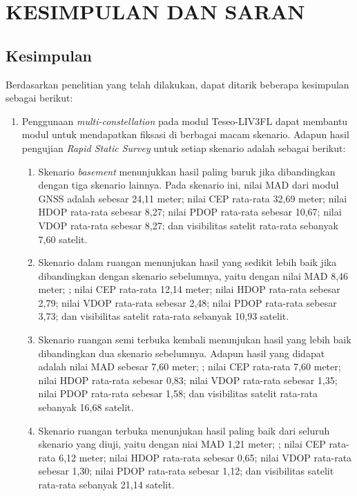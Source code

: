\chapter{KESIMPULAN DAN SARAN}

\section{Kesimpulan}
Berdasarkan penelitian yang telah dilakukan, dapat ditarik beberapa kesimpulan sebagai berikut:
\begin{enumerate}
	\item Penggunaan \textit{multi-constellation} pada modul Teseo\hyp{}LIV3FL dapat membantu modul untuk mendapatkan fiksasi di berbagai macam skenario. Adapun hasil pengujian \textit{Rapid Static Survey} untuk setiap skenario adalah sebagai berikut:
	\begin{enumerate}
		\item Skenario \textit{basement} menunjukkan hasil paling buruk jika dibandingkan dengan tiga skenario lainnya. Pada skenario ini, nilai MAD dari modul GNSS adalah sebesar 24,11 meter; nilai CEP rata-rata 32,69 meter; nilai HDOP rata-rata sebesar 8,27; nilai PDOP rata-rata sebesar 10,67; nilai VDOP rata-rata sebesar 8,27; dan visibilitas satelit rata-rata sebanyak 7,60 satelit.
		
		\item Skenario dalam ruangan menunjukan hasil yang sedikit lebih baik jika dibandingkan dengan skenario sebelumnya, yaitu dengan nilai MAD 8,46 meter; ; nilai CEP rata-rata 12,14 meter; nilai HDOP rata-rata sebesar 2,79; nilai VDOP rata-rata sebesar 2,48; nilai PDOP rata-rata sebesar 3,73; dan visibilitas satelit rata-rata sebanyak 10,93 satelit.
		
		\item Skenario ruangan semi terbuka kembali menunjukan hasil yang lebih baik dibandingkan dua skenario sebelumnya. Adapun hasil yang didapat adalah nilai MAD sebesar 7,60 meter; ; nilai CEP rata-rata 7,60 meter; nilai HDOP rata-rata sebesar 0,83; nilai VDOP rata-rata sebesar 1,35; nilai PDOP rata-rata sebesar 1,58; dan visibilitas satelit rata-rata sebanyak 16,68 satelit.
		
		\item Skenario ruangan terbuka menunjukan hasil paling baik dari seluruh skenario yang diuji, yaitu dengan niai MAD 1,21 meter; ; nilai CEP rata-rata 6,12 meter; nilai HDOP rata-rata sebesar 0,65; nilai VDOP rata-rata sebesar 1,30; nilai PDOP rata-rata sebesar 1,12; dan visibilitas satelit rata-rata sebanyak 21,14 satelit.
	\end{enumerate}
	

\end{enumerate}
